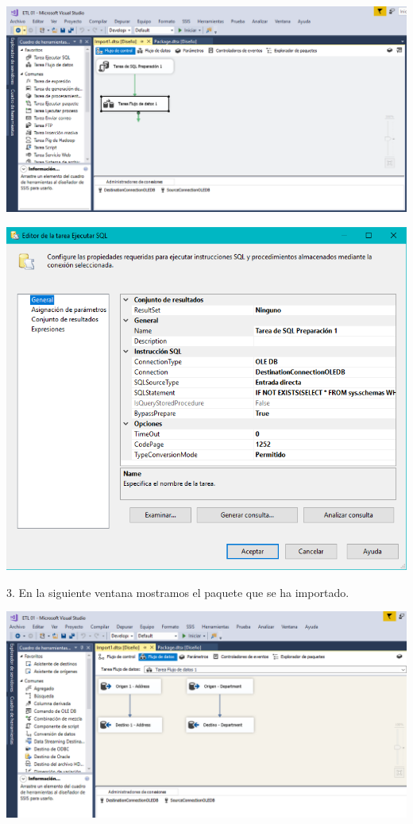 	\begin{center}
	\includegraphics[width=\columnwidth]{images/task2/img15}
    \end{center}	
    
	\begin{center}
	\includegraphics[width=\columnwidth]{images/task2/img16}
	\end{center}	

3. En la siguiente ventana mostramos el paquete que se ha importado.
	\begin{center}
	\includegraphics[width=\columnwidth]{images/task2/img17}
    \end{center}	
    
